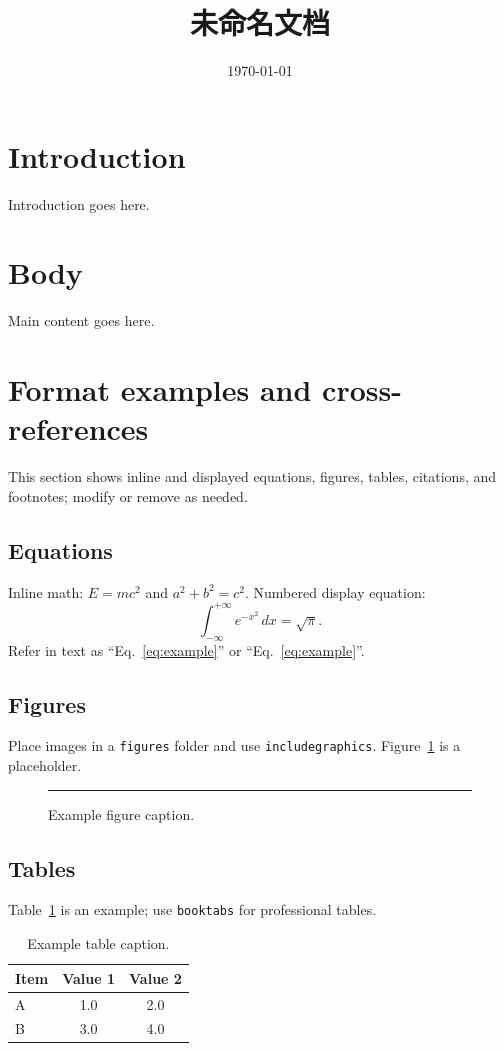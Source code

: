 \documentclass{article}
\title{未命名文档}
\author{}
\date{\today}
\begin{document}
\maketitle

\section{Introduction}
Introduction goes here.

\section{Body}
Main content goes here.

\section{Format examples and cross-references}
This section shows inline and displayed equations, figures, tables, citations, and footnotes; modify or remove as needed.

\subsection{Equations}
Inline math: $E=mc^2$ and \( a^2 + b^2 = c^2 \). Numbered display equation:
\begin{equation}
  \label{eq:example}
  \int_{-\infty}^{+\infty} e^{-x^2} \, dx = \sqrt{\pi}.
\end{equation}
Refer in text as ``Eq.~\eqref{eq:example}'' or ``Eq.~\ref{eq:example}''.

\subsection{Figures}
Place images in a \texttt{figures} folder and use \texttt{includegraphics}. Figure~\ref{fig:example} is a placeholder.
\begin{figure}[htbp]
  \centering
  \rule{4cm}{2.5cm}  %
  \caption{Example figure caption.}
  \label{fig:example}
\end{figure}

\subsection{Tables}
Table~\ref{tab:example} is an example; use \texttt{booktabs} for professional tables.
\begin{table}[htbp]
  \centering
  \caption{Example table caption.}
  \label{tab:example}
  \begin{tabular}{lcc}
    \toprule
    Item  & Value 1 & Value 2 \\
    \midrule
    A     & 1.0     & 2.0     \\
    B     & 3.0     & 4.0     \\
    \bottomrule
  \end{tabular}
\end{table}
\end{document}
